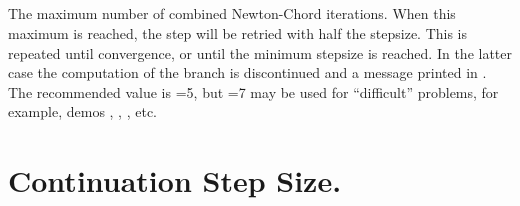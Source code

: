 \subsection{}  \label{sec:ITNW}


 The maximum number of combined Newton-Chord iterations.
 When this maximum is reached, the step will be retried with 
 half the stepsize.
 This is repeated until convergence, or until the minimum
 stepsize is reached. In the latter case the computation of
 the branch is discontinued and a message printed in .
 The recommended value is =5, but =7 may be used for 
 ``difficult'' problems, for example, 
 demos , , , etc.

\section{ Continuation Step Size.} \label{sec:step_size}
\subsection{}  \label{sec:DS}


